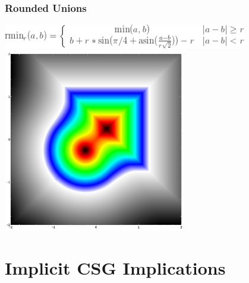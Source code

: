 \documentclass{beamer}
\begin{document}
\begin{frame}
\frametitle{Rounded Unions}
\includegraphics[width=0.8\textwidth, center]{rounded_union_formula.png}
\includegraphics[width=0.6\textwidth, center]{implicit_union_rounded_square_circle.jpg}
\end{frame}

\section{Implicit CSG Implications}
\end{document}
